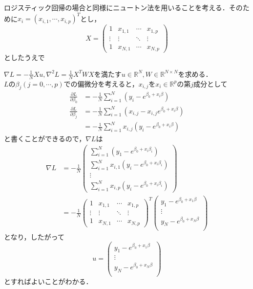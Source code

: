 \documentclass{jsarticle}
\theoremstyle{definition}
\theoremstyle{mystyle} %
\begin{document}
ロジスティック回帰の場合と同様にニュートン法を用いることを考える．そのために$x_i=(x_{i,1},\cdots ,x_{i,p})^T$とし，
$$X=\begin{pmatrix}
1 & x_{1,1} & \cdots & x_{1,p}\\
\vdots & \vdots &\ddots & \vdots\\
1 & x_{N,1}&\cdots & x_{N,p}
\end{pmatrix}$$
としたうえで

$\nabla L=-\frac{1}{N}Xu,\nabla^2 L=\frac{1}{N}X^TWX$を満たす$u\in \mathbb{R}^{N},W\in \mathbb{R}^{N\times N}$を求める．\\

$L$の$\beta_j(j=0,\cdots,p)$での偏微分を考えると，$x_{i,j}$を$x_i\in \mathbb{R}^p$の第$j$成分として
\begin{align*}
\frac{\partial L}{\partial \beta_0}&=-\frac{1}{N}\sum_{i=1}^N(y_i-e^{\beta_0+x_i\beta})\\
\frac{\partial L}{\partial \beta_j}&=-\frac{1}{N}\sum_{i=1}^N(x_{i,j}-x_{i,j}e^{\beta_0+x_i\beta})\\
&=-\frac{1}{N}\sum_{i=1}^Nx_{i,j}(y_i-e^{\beta_0+x_i\beta})
\end{align*}
と書くことができるので，$\nabla L$は
\begin{align*}
\nabla L&=-\frac{1}{N}\left(\begin{array}{c}
\sum_{i=1}^N(y_1-e^{\beta_0+x_i\beta_i})\\
\sum_{i=1}^Nx_{i,1}(y_i-e^{\beta_0+x_i\beta_i})\\
\vdots \\
\sum_{i=1}^Nx_{i,p}(y_i-e^{\beta_0+x_i\beta_i})
\end{array}\right)\\
&=-\frac{1}{N}\begin{pmatrix}
1 & x_{1,1} & \cdots & x_{1,p}\\
\vdots & \vdots &\ddots & \vdots\\
1 & x_{N,1}&\cdots & x_{N,p}
\end{pmatrix}^T\begin{pmatrix}
y_1-e^{\beta_0+x_1\beta}\\
\vdots\\
y_N-e^{\beta_0+x_N\beta}\\
\end{pmatrix}
\end{align*}
となり，したがって
$$u=\begin{pmatrix}
y_1-e^{\beta_0+x_1\beta}\\
\vdots\\
y_N-e^{\beta_0+x_N\beta}\\
\end{pmatrix}$$
とすればよいことがわかる．\\
\end{document}
